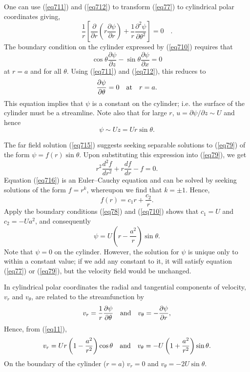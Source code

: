 \documentclass[twoside,a4paper,11pt]{report}
\begin{document}
One can use (\ref{eq711}) and (\ref{eq712}) to transform (\ref{eq77}) to cylindrical polar 
coordinates giving,
\begin{equation}
\label{eq79}
\frac{1}{r}\left[ {\frac{\partial }{\partial r}\left( {r\frac{\partial 
\psi }{\partial r}} \right)+\frac{1}{r}\frac{\partial ^2\psi 
}{\partial \theta ^2}} \right]=0\quad .
\end{equation}
The boundary condition on the cylinder expressed by (\ref{eq710}) requires that
\[
\cos \theta \frac{\partial \psi }{\partial z}-\sin \theta \frac{\partial 
\psi }{\partial x}=0
\]
at $r = a$ and for all $\theta $. Using (\ref{eq711}) and (\ref{eq712}), this reduces to
\[ \frac{\partial \psi }{\partial \theta }=0 \quad \hbox{at}\quad  r = a. \label{eq714} \]
This equation implies that $\psi $ is a constant on the cylinder; i.e. the 
surface of the cylinder must be a streamline. Note also that for large $r$, 
$u = \partial \psi /\partial z \sim  U$ and hence 
\begin{equation}
\psi  \sim Uz = 
Ur \sin \theta . \label{eq715} \end{equation}

The far field solution (\ref{eq715}) suggests seeking separable solutions to (\ref{eq79}) 
of the form $\psi =f\left( r \right)\sin \theta $. Upon substituting this 
expression into (\ref{eq79}), we get
\begin{equation}
\label{eq716}
r^2\frac{d^2f}{dr^2}+r\frac{df}{dr}-f=0.
\end{equation}
Equation (\ref{eq716}) is an Euler--Cauchy equation and can be solved by seeking 
solutions of the form $f=r^k$, whereupon we find that $ k = \pm  1$. Hence,
\[
f(r)=c_1 r+\frac{c_2 }{r}.
\]
Apply the boundary conditions (\ref{eq78}) and (\ref{eq710}) shows that $c_{1} = U$ and 
$c_{2} = -Ua^{2}$, and consequently
\begin{equation}
\label{eq717}
\psi =U\left( {r-\frac{a^2}{r}} \right)\sin \theta .
\end{equation}
Note that $\psi  = 0$ on the cylinder. However, the solution for 
$\psi $ is unique only to within a constant value; if we add any constant to 
it, it will satisfy equation (\ref{eq77}) or (\ref{eq79}), but the velocity field would 
be unchanged.

In cylindrical polar coordinates the radial and tangential components of
velocity, $v_{r}$ and $v_{\theta }$, are related to the streamfunction by 
\[
v_r =\frac{1}{r}\frac{\partial \psi }{\partial \theta }\quad 
\hbox{and} \quad v_\theta =-\frac{\partial \psi }{\partial r}, 
\] 
Hence, from (\ref{eq11}), 
\[
v_r =Ur\left( {1-\frac{a^2}{r^2}} \right)\cos \theta \quad \hbox{and} \quad
v_\theta =-U\left( {1+\frac{a^2}{r^2}} \right)\sin \theta . 
\]
On the boundary
of the cylinder ($r = a$) $v_{r} = 0$ and $v_{\theta } = -2U\sin \theta $.
\end{document}
